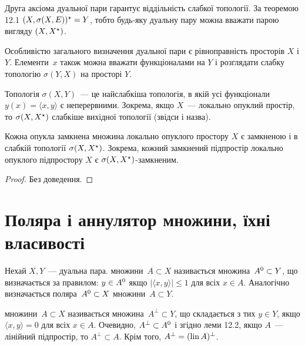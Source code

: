 \begin{remark}
    Друга аксіома дуальної пари гарантує віддільність слабкої топології. За теоремою 12.1 $(X, \sigma(X, E))^\star = Y$, тобто будь-яку дуальну пару можна вважати парою вигляду $(X, X^\star)$.
\end{remark}

\begin{remark}
    Особливістю загального визначення дуальної пари є рівноправність просторів $X$ і $Y$. Елементи~$x$ також можна вважати функціоналами на $Y$ і розглядати слабку топологію $\sigma(Y, X)$ на просторі $Y$.
\end{remark}

\begin{remark}
    Топологія $\sigma(X, Y)$~--- це найслабкіша топологія, в якій усі функціонали $y(x) = \langle x, y \rangle$ є неперервними. Зокрема, якщо $X$~--- локально опуклий простір, то $\sigma(X, X^\star)$ слабкіше вихідної топології (звідси і назва).
\end{remark}

\begin{theorem}
    Кожна опукла замкнена множина локально опуклого простору $X$ є замкненою і в слабкій топології $\sigma(X, X^\star)$. Зокрема, кожний замкнений підпростір локально опуклого підпростору $X$ є $\sigma(X, X^\star)$-замкненим.
\end{theorem}

\begin{proof}
    Без доведення.
\end{proof}

\section{Поляра і аннулятор множини, їхні власивості}

\begin{definition}
    Нехай $X, Y$~--- дуальна пара.  множини~$A \subset X$ називається множина~$A^0 \subset Y$, що визначається за правилом: $y \in A^0$ якщо $|\langle x, y \rangle| \le 1$ для всіх $x \in A$. Аналогічно визначається поляра~$A^0 \subset X$ множини~$A \subset Y$.
\end{definition}

\begin{definition}
     множини~$A \subset X$ називається множина~$A^\perp \subset Y$, що складається з тих $y \in Y$, якщо $\langle x, y \rangle = 0$ для всіх $x \in A$. Очевидно, $A^\perp \subset A^0$ і згідно леми 12.2, якщо $A$~--- лінійний підпростір, то $A^\perp \subset A$. Крім того, $A^\perp = (\operatorname{lin} A)^\perp$.
\end{definition}

